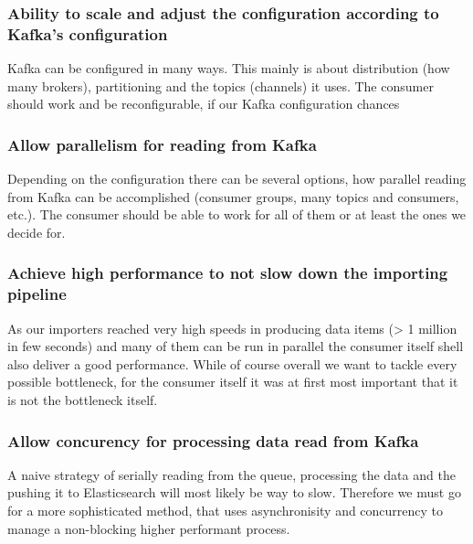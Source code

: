 \subsubsection{Ability to scale and adjust the configuration according
to Kafka's
configuration}\label{ability-to-scale-and-adjust-the-configuration-according-to-kafkas-configuration}

Kafka can be configured in many ways. This mainly is about distribution
(how many brokers), partitioning and the topics (channels) it uses. The
consumer should work and be reconfigurable, if our Kafka configuration
chances

\subsubsection{Allow parallelism for reading from
Kafka}\label{allow-parallelism-for-reading-from-kafka}

Depending on the configuration there can be several options, how
parallel reading from Kafka can be accomplished (consumer groups, many
topics and consumers, etc.). The consumer should be able to work for all
of them or at least the ones we decide for.

\subsubsection{Achieve high performance to not slow down the importing
pipeline}\label{achieve-high-performance-to-not-slow-down-the-importing-pipeline}

As our importers reached very high speeds in producing data items
(\textgreater{} 1 million in few seconds) and many of them can be run in
parallel the consumer itself shell also deliver a good performance.
While of course overall we want to tackle every possible bottleneck, for
the consumer itself it was at first most important that it is not the
bottleneck itself.

\subsubsection{Allow concurency for processing data read from
Kafka}\label{allow-concurency-for-processing-data-read-from-kafka}

A naive strategy of serially reading from the queue, processing the data
and the pushing it to Elasticsearch will most likely be way to slow.
Therefore we must go for a more sophisticated method, that uses
asynchronisity and concurrency to manage a non-blocking higher
performant process.

